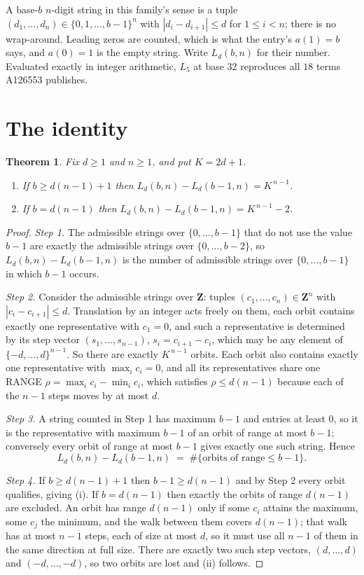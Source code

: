 \documentclass[11pt,a4paper]{article}
\theoremstyle{plain}
\newtheorem{theorem}{Theorem}
\theoremstyle{definition}
\begin{document}
A base-$b$ $n$-digit string in this family's sense is a tuple
$(d_1,\dots,d_n)\in\{0,1,\dots,b-1\}^{n}$ with $|d_i-d_{i+1}|\le d$ for $1\le i<n$; there
is no wrap-around. Leading zeros are counted, which is what the entry's $a(1)=b$ says, and
$a(0)=1$ is the empty string. Write $L_d(b,n)$ for their number. Evaluated exactly in integer
arithmetic, $L_{5}$ at base $32$ reproduces all $18$ terms A126553 publishes.

\section{The identity}

\begin{theorem}
Fix $d\ge1$ and $n\ge1$, and put $K=2d+1$.
\begin{enumerate}
\item[(i)] If $b\ge d(n-1)+1$ then $L_d(b,n)-L_d(b-1,n)=K^{\,n-1}$.
\item[(ii)] If $b=d(n-1)$ then $L_d(b,n)-L_d(b-1,n)=K^{\,n-1}-2$.
\end{enumerate}
\end{theorem}

\begin{proof}
\emph{Step 1.} The admissible strings over $\{0,\dots,b-1\}$ that do not use the value $b-1$
are exactly the admissible strings over $\{0,\dots,b-2\}$, so $L_d(b,n)-L_d(b-1,n)$ is the
number of admissible strings over $\{0,\dots,b-1\}$ in which $b-1$ occurs.

\emph{Step 2.} Consider the admissible strings over $\mathbf{Z}$: tuples
$(c_1,\dots,c_n)\in\mathbf{Z}^{n}$ with $|c_i-c_{i+1}|\le d$. Translation by an integer acts
freely on them, each orbit contains exactly one representative with $c_1=0$, and such a
representative is determined by its step vector $(s_1,\dots,s_{n-1})$, $s_i=c_{i+1}-c_i$,
which may be any element of $\{-d,\dots,d\}^{n-1}$. So there are exactly $K^{\,n-1}$ orbits.
Each orbit also contains exactly one representative with $\max_i c_i=0$, and all its
representatives share one RANGE $\rho=\max_ic_i-\min_ic_i$, which satisfies
$\rho\le d(n-1)$ because each of the $n-1$ steps moves by at most $d$.

\emph{Step 3.} A string counted in Step 1 has maximum $b-1$ and entries at least $0$, so it is
the representative with maximum $b-1$ of an orbit of range at most $b-1$; conversely every orbit
of range at most $b-1$ gives exactly one such string. Hence
\[
L_d(b,n)-L_d(b-1,n)\;=\;\#\{\text{orbits of range}\le b-1\} .
\]

\emph{Step 4.} If $b\ge d(n-1)+1$ then $b-1\ge d(n-1)$ and by Step 2 every orbit qualifies,
giving (i). If $b=d(n-1)$ then exactly the orbits of range $d(n-1)$ are excluded. An orbit has
range $d(n-1)$ only if some $c_i$ attains the maximum, some $c_j$ the minimum, and the walk
between them covers $d(n-1)$; that walk has at most $n-1$ steps, each of size at most $d$, so it
must use all $n-1$ of them in the same direction at full size. There are exactly two such step
vectors, $(d,\dots,d)$ and $(-d,\dots,-d)$, so two orbits are lost and (ii) follows.
\end{proof}
\end{document}
